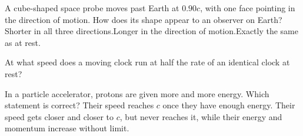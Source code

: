 \begin{quizq}{}
A cube-shaped space probe moves past Earth at $0.90c$, with one face pointing in the direction of motion.
How does its shape appear to an observer on Earth?
  {Shorter in all three directions.}{Longer in the direction of motion.}{Exactly the same as at rest.}
\end{quizq}

\begin{quizq}{}
At what speed does a moving clock run at half the rate of an identical clock at rest?
\end{quizq}

\begin{quizq}{}
In a particle accelerator, protons are given more and more energy. Which statement is correct?
  {Their speed reaches $c$ once they have enough energy.}
  {Their speed gets closer and closer to $c$, but never reaches it, while their energy and momentum
   increase without limit.}
\end{quizq}
